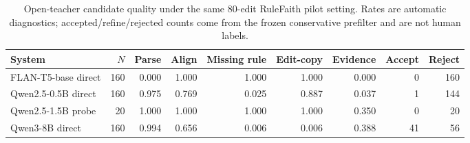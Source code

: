 \begin{table}[t]
\centering
\small
\begin{tabular}{lrrrrrrrr}
\toprule
System & $N$ & Parse & Align & Missing rule & Edit-copy & Evidence & Accept & Reject \\
\midrule
FLAN-T5-base direct & 160 & 0.000 & 1.000 & 1.000 & 1.000 & 0.000 & 0 & 160 \\
Qwen2.5-0.5B direct & 160 & 0.975 & 0.769 & 0.025 & 0.887 & 0.037 & 1 & 144 \\
Qwen2.5-1.5B probe & 20 & 1.000 & 1.000 & 1.000 & 1.000 & 0.350 & 0 & 20 \\
Qwen3-8B direct & 160 & 0.994 & 0.656 & 0.006 & 0.006 & 0.388 & 41 & 56 \\
\bottomrule
\end{tabular}
\caption{Open-teacher candidate quality under the same 80-edit RuleFaith pilot setting. Rates are automatic diagnostics; accepted/refine/rejected counts come from the frozen conservative prefilter and are not human labels.}
\label{tab:rulefaith-open-teacher-baselines}
\end{table}
